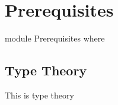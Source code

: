 \chapter{Prerequisites}

\begin{code}
  module Prerequisites where
\end{code}

\section{Type Theory}

This is type theory
